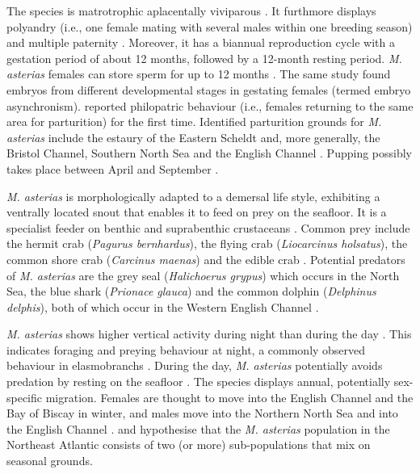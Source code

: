 \documentclass[
  authoryear,
  review,
  3p]{elsarticle}
\begin{document}
The species is matrotrophic aplacentally viviparous \citep[i.e., embryos
absorb nutrients from a yolk sack that is used up during
gestation,][]{farrell_2010a, mccullyphillips_2015}. It furthmore
displays polyandry (i.e., one female mating with several males within
one breeding season) and multiple paternity \citep[i.e., pups within one
litter originate from several males,][]{farrell_2014}. Moreover, it has
a biannual reproduction cycle with a gestation period of about 12
months, followed by a 12-month resting period. \emph{M. asterias}
females can store sperm for up to 12 months \citep{farrell_2010a}. The
same study found embryos from different developmental stages in
gestating females (termed embryo asynchronism). \citet{griffiths_2020}
reported philopatric behaviour (i.e., females returning to the same area
for parturition) for the first time. Identified parturition grounds for
\emph{M. asterias} include the estaury of the Eastern Scheldt and, more
generally, the Bristol Channel, Southern North Sea and the English
Channel \citep{dureuil_2013, mccullyphillips_2015, breve_2016}. Pupping
possibly takes place between April and September
\citep{farrell_2010a, mccullyphillips_2015}.

\emph{M. asterias} is morphologically adapted to a demersal life style,
exhibiting a ventrally located snout that enables it to feed on prey on
the seafloor. It is a specialist feeder on benthic and suprabenthic
crustaceans \citep{mccullyphillips_2020, bitonporsmoguer_2022}. Common
prey include the hermit crab (\emph{Pagurus bernhardus}), the flying
crab (\emph{Liocarcinus holsatus}), the common shore crab
(\emph{Carcinus maenas}) and the edible crab \citep[\emph{Cancer
pagurus},][]{mccullyphillips_2015, mccullyphillips_2020}. Potential
predators of \emph{M. asterias} are the grey seal (\emph{Halichoerus
grypus}) which occurs in the North Sea, the blue shark (\emph{Prionace
glauca}) and the common dolphin (\emph{Delphinus delphis}), both of
which occur in the Western English Channel \citep{griffiths_2020}.

\emph{M. asterias} shows higher vertical activity during night than
during the day \citep{griffiths_2020}. This indicates foraging and
preying behaviour at night, a commonly observed behaviour in
elasmobranchs \citep{sims_2006}. During the day, \emph{M. asterias}
potentially avoids predation by resting on the seafloor
\citep{griffiths_2020}. The species displays annual, potentially
sex-specific migration. Females are thought to move into the English
Channel and the Bay of Biscay in winter, and males move into the
Northern North Sea and into the English Channel
\citep{breve_2016, breve_2020, griffiths_2020}. \citet{breve_2016} and
\citet{griffiths_2020} hypothesise that the \emph{M. asterias}
population in the Northeast Atlantic consists of two (or more)
sub-populations that mix on seasonal grounds.
\end{document}

